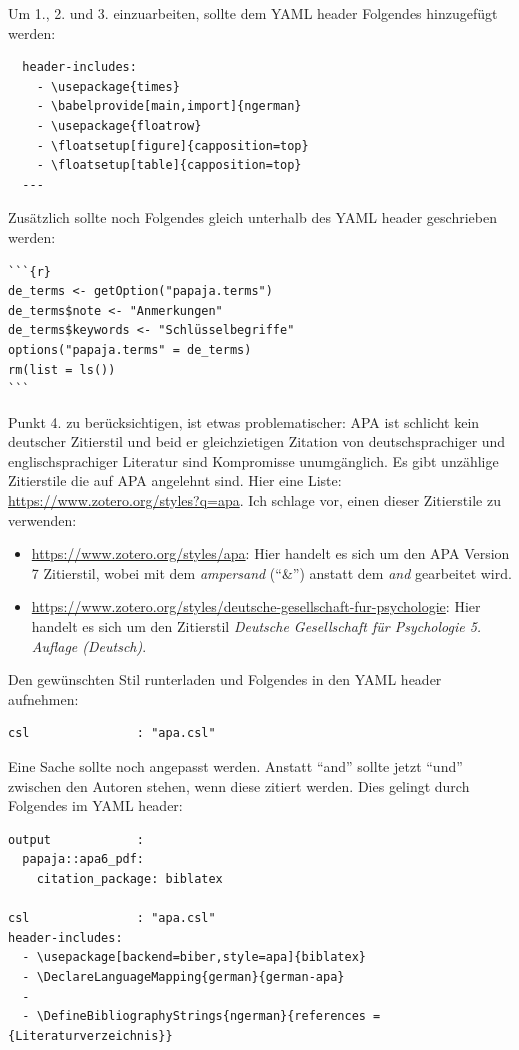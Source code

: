 \documentclass[
  doc,floatsintext]{apa6}
\providecommand{\tightlist}{%
  \setlength{\itemsep}{0pt}\setlength{\parskip}{0pt}}
\begin{document}
Um 1., 2. und 3. einzuarbeiten, sollte dem YAML header Folgendes hinzugefügt werden:

\begin{verbatim}
  header-includes:
    - \usepackage{times}
    - \babelprovide[main,import]{ngerman}
    - \usepackage{floatrow}
    - \floatsetup[figure]{capposition=top}
    - \floatsetup[table]{capposition=top}
  ---
\end{verbatim}

Zusätzlich sollte noch Folgendes gleich unterhalb des YAML header geschrieben werden:

\begin{verbatim}
```{r}
de_terms <- getOption("papaja.terms")
de_terms$note <- "Anmerkungen"
de_terms$keywords <- "Schlüsselbegriffe"
options("papaja.terms" = de_terms) 
rm(list = ls())
```
\end{verbatim}

Punkt 4. zu berücksichtigen, ist etwas problematischer: APA ist schlicht kein deutscher Zitierstil und beid er gleichzietigen Zitation von deutschsprachiger und englischsprachiger Literatur sind Kompromisse unumgänglich.
Es gibt unzählige Zitierstile die auf APA angelehnt sind. Hier eine Liste: \url{https://www.zotero.org/styles?q=apa}.
Ich schlage vor, einen dieser Zitierstile zu verwenden:

\begin{itemize}
\tightlist
\item
  \url{https://www.zotero.org/styles/apa}: Hier handelt es sich um den APA Version 7 Zitierstil, wobei mit dem \emph{ampersand} (``\&'') anstatt dem \emph{and} gearbeitet wird.
\item
  \url{https://www.zotero.org/styles/deutsche-gesellschaft-fur-psychologie}: Hier handelt es sich um den Zitierstil \emph{Deutsche Gesellschaft für Psychologie 5. Auflage (Deutsch)}.
\end{itemize}

Den gewünschten Stil runterladen und Folgendes in den YAML header aufnehmen:

\begin{verbatim}
csl               : "apa.csl"
\end{verbatim}

Eine Sache sollte noch angepasst werden. Anstatt ``and'' sollte jetzt ``und'' zwischen den Autoren stehen, wenn diese zitiert werden. Dies gelingt durch Folgendes im YAML header:

\begin{verbatim}
output            : 
  papaja::apa6_pdf:
    citation_package: biblatex

csl               : "apa.csl"
header-includes:
  - \usepackage[backend=biber,style=apa]{biblatex} 
  - \DeclareLanguageMapping{german}{german-apa}
  - 
  - \DefineBibliographyStrings{ngerman}{references = {Literaturverzeichnis}}
\end{verbatim}
\end{document}
